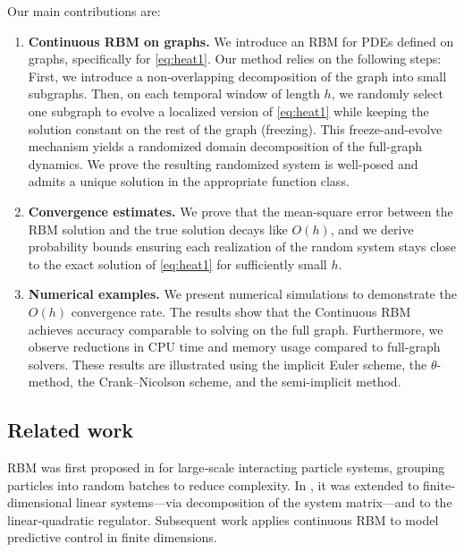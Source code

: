 \documentclass[10pt,a4paper]{amsart}
\begin{document}
Our main contributions are:
\begin{enumerate}
  \item \textbf{Continuous RBM on graphs.} We introduce an RBM for PDEs defined on graphs, specifically for \eqref{eq:heat1}. Our method relies on the following steps: First, we introduce a non‐overlapping decomposition of the graph into small subgraphs. Then, on each temporal window of length $h$, we randomly select one subgraph to evolve a localized version of \eqref{eq:heat1} while keeping the solution constant on the rest of the graph (freezing).  This freeze-and-evolve mechanism yields a randomized domain decomposition of the full-graph dynamics. We prove the resulting randomized system is well-posed and admits a unique solution in the appropriate function class.


  \item \textbf{Convergence estimates.}  
    We prove that the mean‐square error between the RBM solution and the true solution decays like $O(h)$, and we derive probability bounds ensuring each realization of the random system stays close to the exact solution of \eqref{eq:heat1} for sufficiently small $h$.

\item \textbf{Numerical examples.}
We present numerical simulations to demonstrate the $O(h)$ convergence rate. The results show that the Continuous RBM achieves accuracy comparable to solving on the full graph. Furthermore, we observe reductions in CPU time and memory usage compared to full-graph solvers. These results are illustrated using the implicit Euler scheme, the $\theta$-method, the Crank–Nicolson scheme, and the semi-implicit method.
\end{enumerate}



\subsection{Related work}\label{sec:rel_literature}

RBM was first proposed in \cite{ShietalRBM,MR4230431} for large‐scale interacting particle systems, grouping particles into random batches to reduce complexity. In \cite{MR4433122}, it was extended to finite‐dimensional linear systems—via decomposition of the system matrix—and to the linear‐quadratic regulator. Subsequent work \cite{MR4307003,veldman2023stability} applies continuous RBM to model predictive control in finite dimensions.
\end{document}
